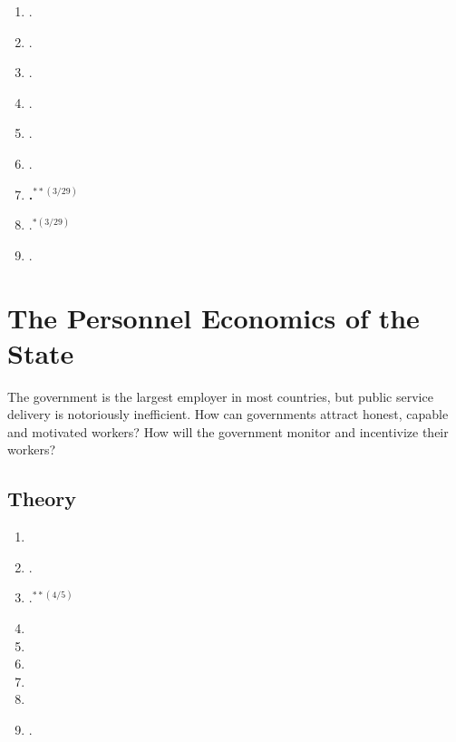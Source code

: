 \documentclass[11pt]{article}
\begin{document}
\begin{enumerate}
\item {}.
\item {}.
\item {}.
\item {}.
\item {}.
\item {}.
\item \textbf{.$^{**(3/29)}$}
\item {}.$^{*(3/29)}$
\item {}.
\end{enumerate}

\section{The Personnel Economics of the State}
The government is the largest employer in most countries, but public service delivery is notoriously inefficient. How can governments attract honest, capable and motivated workers? How will the government monitor and incentivize their workers?


\subsection{Theory}

\begin{enumerate}
\item {}
\item \textbf{}.
\item {}.$^{**(4/5)}$
\item {}
\item {}
\item {}
\item {}
\item {}
\item {}.
\end{enumerate}
\end{document}
